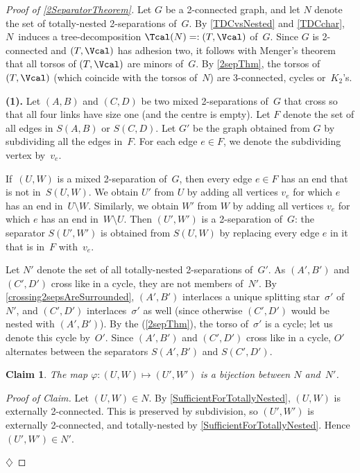 \documentclass{aic}
\newenvironment{cproof}{\noindent\textit{Proof of Claim.}}{\phantom{!}\!\hfill$\diamondsuit$}
\theoremstyle{plain}
\newtheorem{sublem}{Claim}[thm]
\theoremstyle{definition}
\theoremstyle{plain}
\theoremstyle{plain}
\newcommand{\sm}{\setminus}
\begin{document}
\begin{proof}[Proof of \autoref{2SeparatorTheorem}]
Let $G$ be a 2-connected graph, and let $N$ denote the set of totally-nested 2-separations of~$G$.
By \autoref{TDCvsNested} and \autoref{TDCchar}, $N$~induces a tree-decomposition $\Tcal(N)=:(T,\Vcal)$ of~$G$.
Since $G$ is 2-connected and $(T,\Vcal)$ has adhesion two, it follows with Menger's theorem that all torsos of $(T,\Vcal)$ are minors of~$G$.
By \autoref{2sepThm}, the torsos of $(T,\Vcal)$ (which coincide with the torsos of~$N$) are 3-connected, cycles or~$K_2$'s.\medskip

\textbf{(1).} Let $(A,B)$ and $(C,D)$ be two mixed 2-separations of~$G$ that cross so that all four links have size one (and the centre is empty).
Let $F$ denote the set of all edges in $S(A,B)$ or $S(C,D)$.
Let $G'$ be the graph obtained from $G$ by subdividing all the edges in~$F$.
For each edge $e\in F$, we denote the subdividing vertex by~$v_e$.

If~$(U,W)$ is a mixed 2-separation of~$G$, then every edge $e\in F$ has an end that is not in~$S(U,W)$.
We obtain $U'$ from $U$ by adding all vertices $v_e$ for which $e$ has an end in~$U\sm W$.
Similarly, we obtain $W'$ from $W$ by adding all vertices $v_e$ for which $e$ has an end in~$W\sm U$.
Then $(U',W')$ is a 2-separation of~$G$: the separator $S(U',W')$ is obtained from $S(U,W)$ by replacing every edge $e$ in it that is in~$F$ with~$v_e$.

Let $N'$ denote the set of all totally-nested 2-separations of~$G'$.
As $(A',B')$ and $(C',D')$ cross like in a cycle, they are not members of~$N'$.
By \autoref{crossing2sepsAreSurrounded}, $(A',B')$ interlaces a unique splitting star~$\sigma'$ of~$N'$, and $(C',D')$ interlaces~$\sigma'$ as well (since otherwise $(C',D')$ would be nested with $(A',B')$).
By the  (\ref{2sepThm}), the torso of~$\sigma'$ is a cycle; let us denote this cycle by~$O'$.
Since $(A',B')$ and $(C',D')$ cross like in a cycle, $O'$ alternates between the separators $S(A',B')$ and $S(C',D')$.

\begin{sublem}\label{varphiClaim}
    The map $\varphi\colon (U,W)\mapsto (U',W')$ is a bijection between $N$ and~$N'$.
\end{sublem}
\begin{cproof}
Let $(U,W)\in N$.
By \autoref{SufficientForTotallyNested}, $(U,W)$ is externally 2-connected.
This is preserved by subdivision, so $(U',W')$ is externally 2-connected, and totally-nested by \autoref{SufficientForTotallyNested}.
Hence $(U',W')\in N'$.


\end{cproof}
\end{proof}
\end{document}
